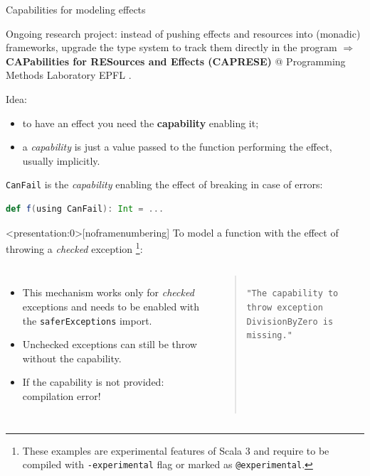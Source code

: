 \documentclass[aspectratio=1610,xcolor=dvipsnames,handout]{beamer}
\begin{document}
\begin{frame}[fragile]{Capabilities for modeling effects}
  \begin{block}{}
    Ongoing research project: instead of pushing effects and resources into (monadic) frameworks, upgrade the type system to track them directly in the program $\Rightarrow$ \textbf{CAPabilities for RESources and Effects (CAPRESE)} @ Programming Methods Laboratory EPFL \cite{capabilities}.
  \end{block}
  Idea:
  \begin{itemize}
    \item to have an effect you need the \textbf{capability} enabling it;
    \item a \textit{capability} is just a value passed to the function performing the effect, usually implicitly.
  \end{itemize}
  \texttt{CanFail} is the \textit{capability} enabling the effect of breaking in case of errors:
  \begin{lstlisting}[language=scala, gobble=4]
    def f(using CanFail): Int = ...
  \end{lstlisting}
\end{frame}
%
\begin{frame}<presentation:0>[noframenumbering]
  \fontsize{8}{10}\selectfont
  To model a function with the effect of throwing a \textit{checked} exception
  \footnote{\tiny
    These examples are experimental features of Scala 3 and require to be compiled with \texttt{-experimental} flag or marked as \texttt{@experimental}.
  }:
  \begin{columns}
      
      \addtolength{\leftmargini}{\labelsep}
      \begin{itemize}
        \item This mechanism works only for \textit{checked} exceptions and needs to be enabled with the \texttt{saferExceptions} import.
        \item Unchecked exceptions can still be throw without the capability.
        \item If the capability is not provided: compilation error!
      \end{itemize}
    \begin{quote}
      \texttt{"The capability to throw exception DivisionByZero is missing."}
    \end{quote}
  \end{columns}
\end{frame}
\end{document}

